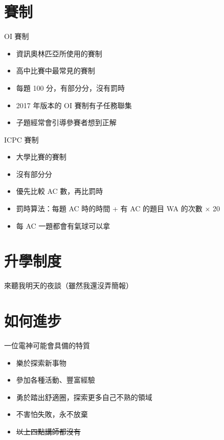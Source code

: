 \documentclass[aspectratio=169]{beamer}
\begin{document}
	\section{賽制}    
    
    \begin{frame}{OI 賽制}
    	\begin{itemize}
    		\item<1-> 資訊奧林匹亞所使用的賽制
    		\item<2-> 高中比賽中最常見的賽制
    		\item<3-> 每題 100 分，有部分分，沒有罰時
    		\item<4-> 2017 年版本的 OI 賽制有子任務聯集
    		\item<5-> 子題經常會引導參賽者想到正解
    	\end{itemize}
    \end{frame}
    
    \begin{frame}{ICPC 賽制}
    	\begin{itemize}
    		\item<1-> 大學比賽的賽制
    		\item<2-> 沒有部分分
    		\item<3-> 優先比較 AC 數，再比罰時
    		\item<4-> 罰時算法：每題 AC 時的時間 + 有 AC 的題目 WA 的次數 $\times$ 20
    		\item<5-> 每 AC 一題都會有氣球可以拿
    	\end{itemize}
    \end{frame}

	\section{升學制度}

	\begin{frame}{}
		\begin{center}
			\large 來聽我明天的夜談（雖然我還沒弄簡報）
		\end{center}
	\end{frame}

	
	\section{如何進步}

	\begin{frame}{一位電神可能會具備的特質}
		\begin{itemize}
			\item<1-> 樂於探索新事物
			\item<2-> 參加各種活動、豐富經驗
			\item<3-> 勇於踏出舒適圈，探索更多自己不熟的領域
			\item<4-> 不害怕失敗，永不放棄
			\item<5-> \sout{以上四點講師都沒有}
		\end{itemize}
	\end{frame}
\end{document}
